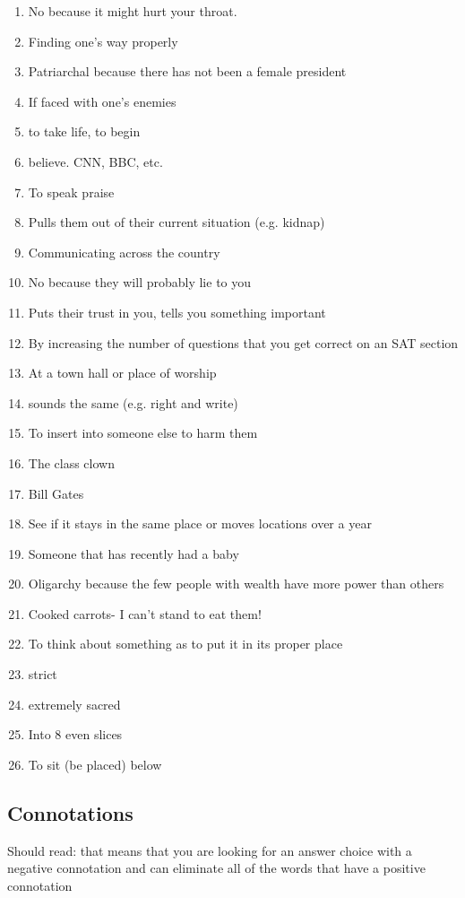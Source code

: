 \begin{enumerate}
\begin{enumerate}
\item No because it might hurt your throat.
\item Finding one's way properly
\item Patriarchal because there has not been a female president
\item If faced with one's enemies
\item to take life, to begin
\item believe. CNN, BBC, etc.
\item To speak praise
\item Pulls them out of their current situation (e.g. kidnap)
\item Communicating across the country
\item No because they will probably lie to you
\item Puts their trust in you, tells you something important
\item By increasing the number of questions that you get correct on an SAT section
\item At a town hall or place of worship
\item sounds the same (e.g. right and write)
\item To insert into someone else to harm them
\item The class clown
\item Bill Gates
\item See if it stays in the same place or moves locations over a year
\item Someone that has recently had a baby
\item Oligarchy because the few people with wealth have more power than others
\item Cooked carrots- I can't stand to eat them!
\item To think about something as to put it in its proper place
\item strict
\item extremely sacred
\item Into 8 even slices
\item To sit (be placed) below
\end{enumerate}

\subsection{Connotations}

Should read: that means that you are looking for an answer choice with a negative connotation and can eliminate all of the words that have a positive connotation


\end{enumerate}
